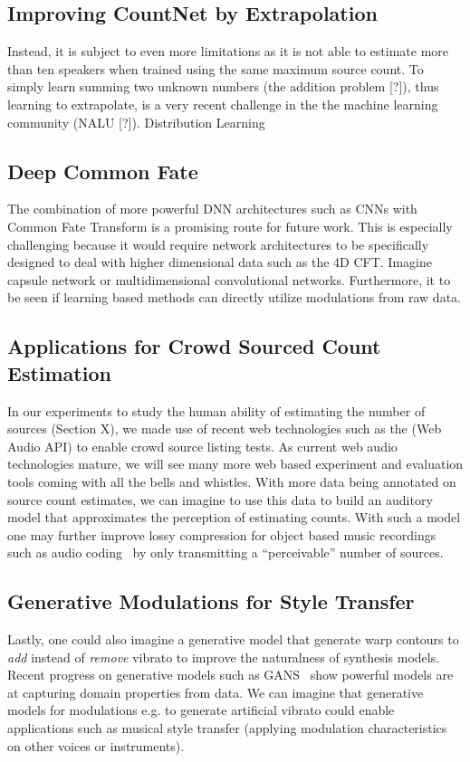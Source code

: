 \subsection*{Improving CountNet by Extrapolation}

Instead, it is subject to even more limitations as it is not able to estimate more than ten speakers when trained using the same maximum source count. 
To simply learn summing two unknown numbers (the addition problem [?]), thus learning to extrapolate, is a very recent challenge in the the machine learning community (NALU [?]).
Distribution Learning

\subsection*{Deep Common Fate}

The combination of more powerful DNN architectures such as CNNs with Common Fate Transform is a promising route for future work. 
This is especially challenging because it would require network architectures to be specifically designed to deal with higher dimensional data such as the 4D CFT. Imagine capsule network or multidimensional convolutional networks. 
Furthermore, it to be seen if learning based methods can directly utilize modulations from raw data.

\subsection*{Applications for Crowd Sourced Count Estimation }

In our experiments to study the human ability of estimating the number of sources (Section X), we made use of recent web technologies such as the (Web Audio API) to enable crowd source listing tests. As current web audio technologies mature, we will see many more web based experiment and evaluation tools coming with all the bells and whistles.
With more data being annotated on source count estimates, we can imagine to use this data to build an auditory model that approximates the perception of estimating counts.
With such a model one may further improve lossy compression for object based music recordings such as audio coding~\cite{herre12saoc} by only transmitting a ``perceivable'' number of sources.

\subsection*{Generative Modulations for Style Transfer}
Lastly, one could also imagine a generative model that generate warp contours to \emph{add} instead of \emph{remove} vibrato to improve the naturalness of synthesis models.
Recent progress on generative models such as GANS~\cite{goodfellow14} show powerful models are at capturing domain properties from data.
We can imagine that generative models for modulations e.g. to generate artificial vibrato could enable applications such as musical style transfer (applying modulation characteristics on other voices or instruments).

